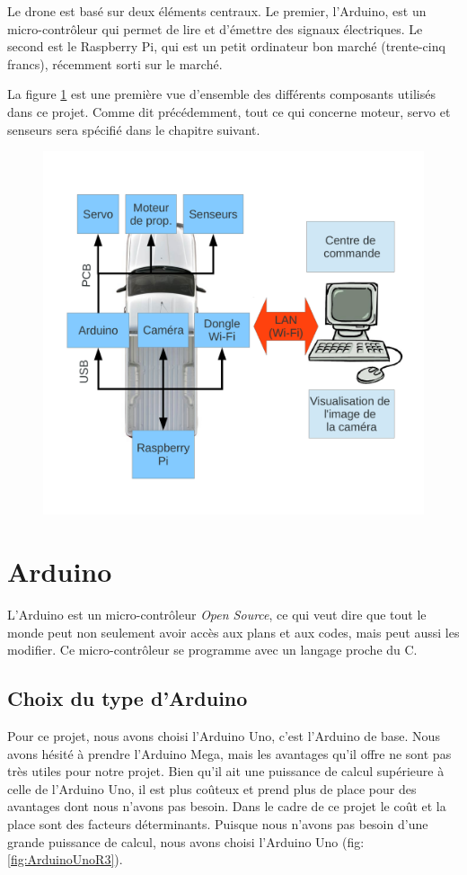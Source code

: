 \documentclass[a4paper,11pt]{report}
\begin{document}
{Le drone est basé sur deux éléments centraux. Le
premier, l'Arduino, est un micro-contrôleur qui permet de lire et d'émettre
des signaux électriques.
Le second est le Raspberry Pi, qui est un petit ordinateur bon marché
(trente-cinq francs), récemment sorti sur le marché. 

La figure
\ref{SchemaProjet} est une première vue d'ensemble des différents composants
utilisés dans ce projet. Comme dit précédemment, tout ce qui concerne moteur,
servo et senseurs sera spécifié dans le chapitre suivant. 

\begin{figure}[h]
\includegraphics[width = 1.0\textwidth]{SchemaPres.pdf}
\caption[Schéma du hardware]{\label{SchemaProjet}}
\end{figure}

\section{Arduino}
L'Arduino \label{Arduino} \cite{Arduino} est un micro-contrôleur \textit{Open Source}, ce qui veut dire que tout le monde peut non seulement avoir accès aux plans et aux codes, mais peut aussi les modifier.\cite{openSource} Ce micro-contrôleur se programme avec un langage proche du C. 


\subsection{Choix du type d'Arduino}
Pour ce projet, nous avons choisi l'Arduino Uno, c'est l'Arduino de base.  Nous avons hésité à prendre l'Arduino Mega, mais les avantages qu'il offre ne sont pas très utiles pour notre projet. Bien qu'il ait une puissance de calcul supérieure à celle de l'Arduino Uno, il est plus coûteux et prend plus de place pour des avantages dont nous n'avons pas besoin. Dans le cadre de ce projet le coût et la place sont des facteurs déterminants.  Puisque nous n'avons pas besoin d'une grande puissance de calcul, nous avons choisi l'Arduino Uno (fig: \ref{fig:ArduinoUnoR3}).\\

}
\end{document}
